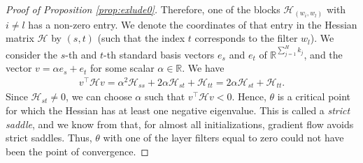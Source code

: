 \documentclass[twoside]{article}
\theoremstyle{definition}
\theoremstyle{remark}
\begin{document}
\begin{proof}[Proof of Proposition \ref{prop:exlude0}]
    Therefore, one of the blocks $\mathcal{H}_{(w_i, w_l)}$ with $i \neq l$ has a non-zero entry.
    We denote the coordinates of that entry in the Hessian matrix $\mathcal{H}$ by $(s,t)$ (such that the index $t$ corresponds to the filter $w_l$).
    We consider the $s$-th and $t$-th standard basis vectors $e_s$ and $e_t$ of $\mathbb{R}^{\sum_{j=1}^H k_j}$, and the vector $v = \alpha e_s + e_t$ for some scalar $\alpha \in \mathbb{R}$.
    We have 
    \begin{align*}
    v^\top \mathcal{H} v = \alpha^2 \mathcal{H}_{ss} + 2 \alpha \mathcal{H}_{st} + \mathcal{H}_{tt} 
    = 2 \alpha \mathcal{H}_{st} + \mathcal{H}_{tt}.
\end{align*}
Since $\mathcal{H}_{st} \neq 0$, we can choose $\alpha$ such that $v^\top \mathcal{H} v < 0$. 
 Hence, $\theta$ is a critical point for which the Hessian has at least one negative eigenvalue. This is called a \emph{strict saddle},
and we know from \cite{bah2022learning} that, for almost all initializations, gradient flow avoids strict saddles. Thus, $\theta$ with one of the layer filters equal to zero could not have been the point of convergence.
\end{proof}
\end{document}
